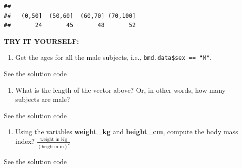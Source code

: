 \documentclass[
]{book}
\newenvironment{Shaded}{\begin{snugshade}}{\end{snugshade}}
\newcommand{\CommentTok}[1]{\textcolor[rgb]{0.56,0.35,0.01}{\textit{#1}}}
\newcommand{\DecValTok}[1]{\textcolor[rgb]{0.00,0.00,0.81}{#1}}
\newcommand{\FunctionTok}[1]{\textcolor[rgb]{0.13,0.29,0.53}{\textbf{#1}}}
\newcommand{\NormalTok}[1]{#1}
\newcommand{\OtherTok}[1]{\textcolor[rgb]{0.56,0.35,0.01}{#1}}
\newcommand{\SpecialCharTok}[1]{\textcolor[rgb]{0.81,0.36,0.00}{\textbf{#1}}}
\newcommand{\StringTok}[1]{\textcolor[rgb]{0.31,0.60,0.02}{#1}}
\providecommand{\tightlist}{%
  \setlength{\itemsep}{0pt}\setlength{\parskip}{0pt}}
\begin{document}
\begin{verbatim}
## 
##   (0,50]  (50,60]  (60,70] (70,100] 
##       24       45       48       52
\end{verbatim}

\textbf{TRY IT YOURSELF:}

\begin{enumerate}
\def\labelenumi{\arabic{enumi})}
\tightlist
\item
  Get the ages for all the male subjects, i.e., \texttt{bmd.data\$sex\ ==\ "M"}.
\end{enumerate}

See the solution code

\begin{Shaded}
\end{Shaded}

\begin{enumerate}
\def\labelenumi{\arabic{enumi})}
\setcounter{enumi}{1}
\tightlist
\item
  What is the length of the vector above? Or, in other words, how many subjects
  are male?
\end{enumerate}

See the solution code

\begin{Shaded}
\end{Shaded}

\begin{enumerate}
\def\labelenumi{\arabic{enumi})}
\setcounter{enumi}{2}
\tightlist
\item
  Using the variables \textbf{weight\_kg} and \textbf{height\_cm}, compute the body mass
  index?
  \(\frac{\text{weight in Kg}}{(\text{heigh in m})^2}\)
\end{enumerate}

See the solution code

\begin{Shaded}
\end{Shaded}
\end{document}
